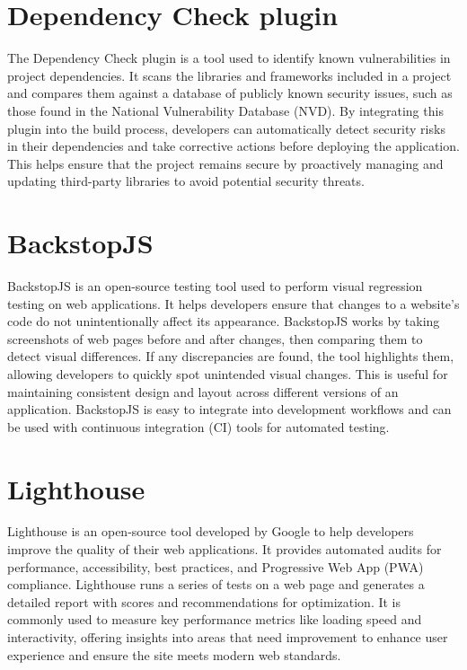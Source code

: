 \documentclass[a4paper,11pt,openright,BCOR=15mm]{scrbook}
\begin{document}
	 
	 \section{Dependency Check plugin}
	 The Dependency Check plugin is a tool used to identify known vulnerabilities in project dependencies. It scans the libraries and frameworks included in a project and compares them against a database of publicly known security issues, such as those found in the National Vulnerability Database (NVD). By integrating this plugin into the build process, developers can automatically detect security risks in their dependencies and take corrective actions before deploying the application. This helps ensure that the project remains secure by proactively managing and updating third-party libraries to avoid potential security threats.
	 
	 \section{BackstopJS}
	 BackstopJS is an open-source testing tool used to perform visual regression testing on web applications. It helps developers ensure that changes to a website's code do not unintentionally affect its appearance. BackstopJS works by taking screenshots of web pages before and after changes, then comparing them to detect visual differences. If any discrepancies are found, the tool highlights them, allowing developers to quickly spot unintended visual changes. This is useful for maintaining consistent design and layout across different versions of an application. BackstopJS is easy to integrate into development workflows and can be used with continuous integration (CI) tools for automated testing.
	 
	 \section{Lighthouse}
	 Lighthouse is an open-source tool developed by Google to help developers improve the quality of their web applications. It provides automated audits for performance, accessibility, best practices, and Progressive Web App (PWA) compliance. Lighthouse runs a series of tests on a web page and generates a detailed report with scores and recommendations for optimization. It is commonly used to measure key performance metrics like loading speed and interactivity, offering insights into areas that need improvement to enhance user experience and ensure the site meets modern web standards.
	 
\end{document}
